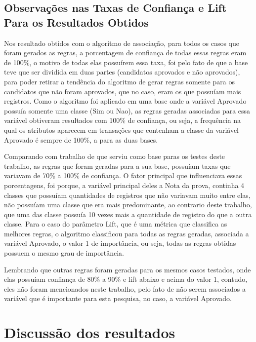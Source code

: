\subsection{Observações nas Taxas de Confiança e Lift Para os Resultados Obtidos}

\par
Nos resultado obtidos com o algoritmo de associação, para todos os casos que foram gerados as regras, a porcentagem de confiança de todas essas regras eram de 100\%, o motivo de todas elas possuírem essa taxa, foi pelo fato de que a base teve que ser dividida em duas partes (candidatos aprovados e não aprovados), para poder retirar a tendência  do algoritmo de gerar regras somente para os candidatos que não foram aprovados, que no caso, eram os que possuíam mais registros. Como o algoritmo foi aplicado em uma base onde a variável Aprovado possuía somente uma classe (Sim ou Nao), as regras geradas associadas para essa variável obtiveram resultados com 100\% de confiança, ou seja, a frequência na qual os atributos aparecem em transações que contenham a classe da variável Aprovado é sempre de 100\%, a para as duas bases. 

\par
Comparando com trabalho de  que serviu como base paras os testes deste trabalho, as regras que foram geradas para a sua base, possuíam taxas que variavam de 70\% a 100\% de confiança. O fator principal que influenciava essas porcentagens, foi porque, a variável principal deles a Nota da prova, continha 4 classes que possuíam quantidades de registros que não variavam muito entre elas, não possuíam uma classe que era mais predominante, ao contrario deste trabalho, que uma das classe possuía 10 vezes mais a quantidade de registro do que a outra classe. Para o caso do parâmetro Lift, que é uma métrica que classifica as melhores regras, o algoritmo classificou para todas as regras geradas, associada a variável Aprovado, o valor 1 de importância, ou seja, todas as regras obtidas possuem o mesmo grau de importância.

\par
Lembrando que outras regras foram geradas para os mesmos casos testados, onde elas possuíam confiança de 80\% a 90\% e lift abaixo e acima do valor 1, contudo, eles não foram mencionados neste trabalho, pelo fato de não serem associados a variável que é importante para esta pesquisa, no caso, a variável Aprovado.

\section{Discussão dos resultados}

